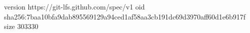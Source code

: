 version https://git-lfs.github.com/spec/v1
oid sha256:7baa10bfa9dab895569129a94ced1af58aa3cb191dc69d3970aff60d1e6b917f
size 303330
